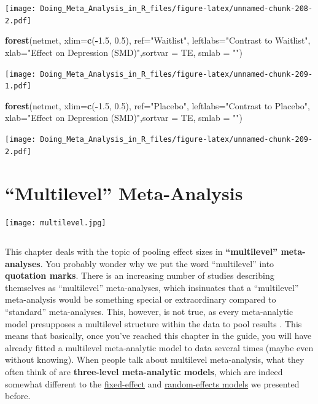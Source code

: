 \documentclass[]{book}
\newenvironment{Shaded}{\begin{snugshade}}{\end{snugshade}}
\newcommand{\DataTypeTok}[1]{\textcolor[rgb]{0.13,0.29,0.53}{#1}}
\newcommand{\FloatTok}[1]{\textcolor[rgb]{0.00,0.00,0.81}{#1}}
\newcommand{\KeywordTok}[1]{\textcolor[rgb]{0.13,0.29,0.53}{\textbf{#1}}}
\newcommand{\NormalTok}[1]{#1}
\newcommand{\OperatorTok}[1]{\textcolor[rgb]{0.81,0.36,0.00}{\textbf{#1}}}
\newcommand{\StringTok}[1]{\textcolor[rgb]{0.31,0.60,0.02}{#1}}
\begin{document}
\texttt{[image: Doing\_Meta\_Analysis\_in\_R\_files/figure-latex/unnamed-chunk-208-2.pdf]}

\begin{Shaded}
\begin{Highlighting}[]
\KeywordTok{forest}\NormalTok{(netmet, }\DataTypeTok{xlim=}\KeywordTok{c}\NormalTok{(}\OperatorTok{-}\FloatTok{1.5}\NormalTok{, }\FloatTok{0.5}\NormalTok{), }\DataTypeTok{ref=}\StringTok{"Waitlist"}\NormalTok{, }\DataTypeTok{leftlabs=}\StringTok{"Contrast to Waitlist"}\NormalTok{, }\DataTypeTok{xlab=}\StringTok{"Effect on Depression (SMD)"}\NormalTok{,}\DataTypeTok{sortvar =}\NormalTok{ TE, }\DataTypeTok{smlab =} \StringTok{""}\NormalTok{)}
\end{Highlighting}
\end{Shaded}

\texttt{[image: Doing\_Meta\_Analysis\_in\_R\_files/figure-latex/unnamed-chunk-209-1.pdf]}

\begin{Shaded}
\begin{Highlighting}[]
\KeywordTok{forest}\NormalTok{(netmet, }\DataTypeTok{xlim=}\KeywordTok{c}\NormalTok{(}\OperatorTok{-}\FloatTok{1.5}\NormalTok{, }\FloatTok{0.5}\NormalTok{), }\DataTypeTok{ref=}\StringTok{"Placebo"}\NormalTok{, }\DataTypeTok{leftlabs=}\StringTok{"Contrast to Placebo"}\NormalTok{, }\DataTypeTok{xlab=}\StringTok{"Effect on Depression (SMD)"}\NormalTok{,}\DataTypeTok{sortvar =}\NormalTok{ TE, }\DataTypeTok{smlab =} \StringTok{""}\NormalTok{)}
\end{Highlighting}
\end{Shaded}

\texttt{[image: Doing\_Meta\_Analysis\_in\_R\_files/figure-latex/unnamed-chunk-209-2.pdf]}

\hypertarget{multilevel-meta-analysis}{%
\chapter{``Multilevel'' Meta-Analysis}\label{multilevel-meta-analysis}}

\texttt{[image: multilevel.jpg]}

\[ \]

This chapter deals with the topic of pooling effect sizes in \textbf{``multilevel'' meta-analyses}. You probably wonder why we put the word ``multilevel'' into \textbf{quotation marks}. There is an increasing number of studies describing themselves as ``multilevel'' meta-analyses, which insinuates that a ``multilevel'' meta-analysis would be something special or extraordinary compared to ``standard'' meta-analyses. This, however, is not true, as every meta-analytic model presupposes a multilevel structure within the data to pool results \citep{pastor2018multilevel}. This means that basically, once you've reached this chapter in the guide, you will have already fitted a multilevel meta-analytic model to data several times (maybe even without knowing). When people talk about multilevel meta-analysis, what they often think of are \textbf{three-level meta-analytic models}, which are indeed somewhat different to the \protect\hyperlink{fixed}{fixed-effect} and \protect\hyperlink{random}{random-effects models} we presented before.
\end{document}
